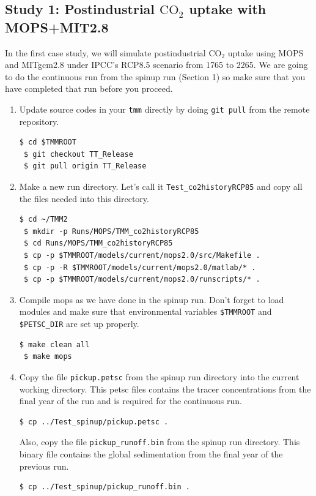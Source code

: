 \documentclass[a4paper]{article}
\def\noin{\noindent }
\begin{document}
\subsection{Study 1: Postindustrial $\mathrm{CO_{2}}$ uptake with MOPS+MIT2.8}
\noin In the first case study, we will simulate postindustrial $\mathrm{CO_{2}}$ uptake using MOPS and MITgcm2.8 under IPCC's RCP8.5 scenario from 1765 to 2265. We are going to do the continuous run from the spinup run (Section 1) so make sure that you have completed that run before you proceed.
\begin{enumerate}

\item Update source codes in your \verb|tmm| directly by doing \verb|git pull| from the remote repository.
\begin{lstlisting}[style=DOS]
 $ cd $TMMROOT
 $ git checkout TT_Release
 $ git pull origin TT_Release
\end{lstlisting}

\item Make a new run directory. Let's call it \verb|Test_co2historyRCP85| and copy all the files needed into this directory.
\begin{lstlisting}[style=DOS]
 $ cd ~/TMM2
 $ mkdir -p Runs/MOPS/TMM_co2historyRCP85
 $ cd Runs/MOPS/TMM_co2historyRCP85
 $ cp -p $TMMROOT/models/current/mops2.0/src/Makefile .
 $ cp -p -R $TMMROOT/models/current/mops2.0/matlab/* .
 $ cp -p $TMMROOT/models/current/mops2.0/runscripts/* .
\end{lstlisting}

\item Compile mops as we have done in the spinup run. Don't forget to load modules and make sure that environmental variables \verb|$TMMROOT| and \verb|$PETSC_DIR| are set up properly.
\begin{lstlisting}[style=DOS]
 $ make clean all
 $ make mops
\end{lstlisting}

\item Copy the file \verb|pickup.petsc| from the spinup run directory into the current working directory. This petsc files contains the tracer concentrations from the final year of the run and is required for the continuous run.
\begin{lstlisting}[style=DOS]
 $ cp ../Test_spinup/pickup.petsc .
\end{lstlisting}

\noin Also, copy the file \verb|pickup_runoff.bin| from the spinup run directory. This binary file contains the global sedimentation from the final year of the previous run.
\begin{lstlisting}[style=DOS]
 $ cp ../Test_spinup/pickup_runoff.bin .
\end{lstlisting}


\end{enumerate}
\end{document}
